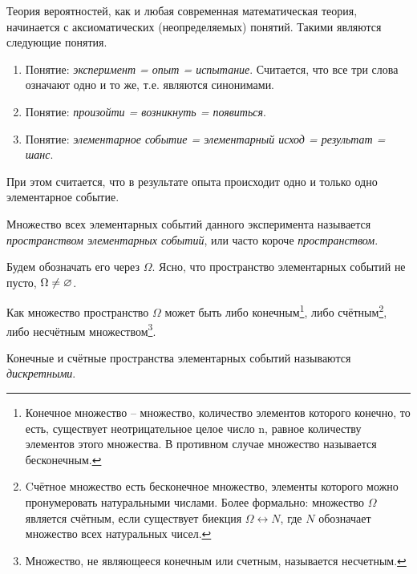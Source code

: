 

Теория вероятностей, как и любая современная математическая теория,
начинается с аксиоматических (неопределяемых) понятий. Такими являются
следующие понятия.
\begin{enumerate}
	\item Понятие: \textit{эксперимент = опыт = испытание}. Считается, что все три
слова означают одно и то же, т.е. являются синонимами.
	\item Понятие: \textit{произойти = возникнуть = появиться}.
	\item Понятие: \textit{элементарное событие = элементарный исход = результат
= шанс}.
\end{enumerate}

При этом считается, что в результате опыта происходит одно и только
одно элементарное событие.

\begin{definition}
	\label{def:2.1}
	Множество всех элементарных событий данного эксперимента называется \textit{пространством элементарных событий}, или часто короче \textit{пространством}.
\end{definition}

Будем обозначать его через $\Omega$. 
Ясно, что пространство элементарных событий не пусто, $\Omega\ne\varnothing$.

Как множество пространство $\Omega$ может быть либо конечным\footnote{Конечное множество -- множество, количество элементов которого конечно, то есть, существует неотрицательное целое число n, равное количеству элементов этого множества. В противном случае множество
называется бесконечным.}, 
либо счётным\footnote{Cчётное множество есть бесконечное множество, элементы которого можно пронумеровать натуральными числами. Более формально: множество $\Omega$ является счётным, если существует биекция $\Omega\leftrightarrow N$, где $N$ обозначает множество всех натуральных чисел.}, 
либо несчётным множеством\footnote{Множество, не являющееся конечным или счетным, называется несчетным.}.

\begin{definition}
	\label{def:2.2}
	Конечные и счётные пространства элементарных событий называются \textit{дискретными}.
\end{definition}

